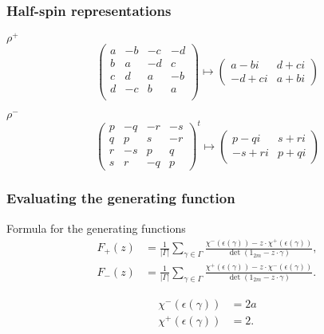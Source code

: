\documentclass{beamer}
\begin{document}
\begin{frame}
\frametitle{Half-spin representations}
\begin{block}{$\rho^+$}
\[
\left(
\begin{array}{cccc}
a & -b & -c & -d \\
b & a & -d & c \\
c & d & a & -b \\
d & -c & b & a \\
\end{array}
\right)
\mapsto
\left(
\begin{array}{cc}
a -bi & d + ci \\
-d + ci & a + bi
\end{array}
\right)
\]
\end{block}

\begin{block}{$\rho^-$}
\[
\left(
\begin{array}{cccc}
p & -q & -r & -s \\
q & p & s & -r \\
r & -s & p & q \\
s & r & -q & p
\end{array}
\right)^{t}
\mapsto
\left(
\begin{array}{cc}
p - qi & s + ri \\
-s + ri & p + qi
\end{array}
\right)
\]
\end{block}
\end{frame}

\begin{frame}
\frametitle{Evaluating the generating function}
	\begin{block}{Formula for the generating functions}
		\begin{align*}
F_+ (z) &= \frac{1}{| \Gamma |} \sum_{\gamma \in \Gamma}  \frac{\chi^-(\epsilon(\gamma)) - z \cdot \chi^+ (\epsilon(\gamma))}{\det(1_{2m} - z \cdot \gamma)}, \\ \label{Spmultgen2}
F_-(z) &= \frac{1}{| \Gamma |} \sum_{\gamma \in \Gamma} \frac{\chi^+(\epsilon(\gamma)) - z \cdot \chi^- (\epsilon(\gamma))}{\det(1_{2m} - z \cdot \gamma)}.
		\end{align*}

		\begin{align*}
			\chi^- (\epsilon(\gamma)) &= 2a \\
			\chi^+ (\epsilon(\gamma)) &= 2.
		\end{align*}
	\end{block}
\end{frame}
\end{document}
